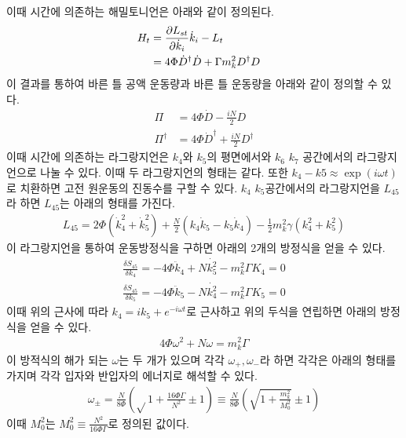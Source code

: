 \documentclass[superscriptaddress,
nofootinbib,byrevtex,fleqn,prd,12pt]{revtex4}
\begin{document}
이때 시간에 의존하는 해밀토니언은 아래와 같이 정의된다.
\begin{align}
  H_{t} &= \frac{\partial L_{st}}{\partial\dot{k}_{i}}\dot{k}_{i}-L_{t} \cr
  &= 4\Phi\dot{D}^{\dagger}\dot{D}+\Gamma m_{k}^{2}D^{\dagger}D
\end{align}
이 결과를 통하여 바른 틀 공액 운동량과 바른 틀 운동량을 아래와 같이 정의할 수 있다.
\begin{align}
  \Pi &= 4\Phi \dot{D} - \frac{iN}{2}D \\
  \Pi^{\dagger} &= 4\Phi \dot{D}^{\dagger} + \frac{iN}{2}D^{\dagger}
\end{align}
이때 시간에 의존하는 라그랑지언은 $k_{4}$와 $ k_{5}$의 평면에서와
 $k_{6} $ $k_{7} $ 공간에서의 라그랑지언으로 나눌 수 있다.
 이때 두 라그랑지언의 형태는 같다. 또한 $k_{4}-k{5} \approx \exp (i\omega t)$로 치환하면 고전 원운동의 진동수를 구할 수 있다. $k_{4} $ $k_{5} $공간에서의 라그랑지언을 $L_{45}$라 하면 $L_{45}$는 아래의 형태를 가진다.
 \begin{align}
   L_{45} = 2 \Phi (\dot{k}_{4}^{2}+\dot{k}_{5}^{2})+ \frac{N}{2}(k_{4}\dot{k}_{5}-k_{5}\dot{k}_{4})- \frac{1}{2} m_{k}^{2} \gamma(k_{4}^{2}+k_{5}^{2})
 \end{align}
 이 라그랑지언을 통하여 운동방정식을 구하면 아래의 2개의 방정식을 얻을 수 있다.
 \begin{align}
   \frac{\delta S_{45}} {\delta k_{4}}= -4 \Phi \ddot{k}_{4} +N \dot{k_{5}^{2}} - m_{k}^{2} \Gamma K_{4} = 0 \\
   \frac{\delta S_{45}} {\delta k_{5}}= -4 \Phi \ddot{k}_{5} -N \dot{k_{4}^{2}} - m_{k}^{2} \Gamma K_{5} = 0
 \end{align}
 이때 위의 근사에 따라 $k_{4}= i k_{5} + e^{-i\omega t}$로 근사하고 위의 두식을 연립하면 아래의 방정식을 얻을 수 있다.
 \begin{align}
   4\Phi \omega^{2} + N \omega = m_{k}^{2} \Gamma
 \end{align}
 이 방적식의 해가 되는 $ \omega$는 두 개가 있으며 각각 $\omega_{+}, \omega_{-} $라 하면 각각은 아래의 형태를 가지며 각각 입자와 반입자의 에너지로 해석할 수 있다.
 \begin{align}
   \omega_{\pm} = \frac{N}{8\Phi}(\sqrt{}1+ \frac{16\Phi \Gamma}{N^{2}}\pm 1)
   \equiv \frac{N}{8\Phi} \left(\sqrt{1+ \frac{m_{k}^{2}}{M_{0}^{2}}} \pm 1 \right)
 \end{align}
 이때 $M_{0}^{2}$는 $M_{0}^{2} \equiv \frac{N^{2}}{16 \Phi \Gamma} $로 정의된 값이다.
\newpage
\end{document}
